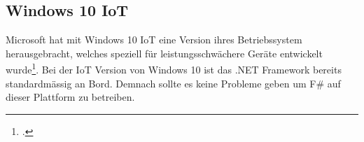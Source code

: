 \subsection{Windows 10 IoT}
Microsoft hat mit Windows 10 IoT eine Version ihres Betriebssystem herausgebracht, welches speziell für leistungsschwächere Geräte entwickelt wurde\footcite{Windows_IoT_2016-04-24}. Bei der IoT Version von Windows 10 ist das .NET Framework bereits standardmässig an Bord. Demnach sollte es keine Probleme geben um F\# auf dieser Plattform zu betreiben.








